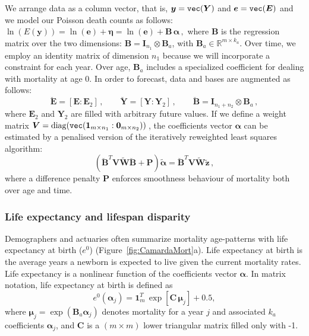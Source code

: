 \documentclass[a4paper,twoside, openright, 12pt, leqno]{article}
\begin{document}
We arrange data as a column vector, that is, $\bm{y} = \verb"vec"(\bm{Y})$ and $\bm{e} = \verb"vec"(\bm{E})$ and we model our Poisson death counts as follows: $\ln(E(\bm{y})) = \ln(\bm{e})+ \bm{\eta} = \ln(\bm{e})+ \bm{B}\,\bm{\alpha}\, , $ where $\bm{B}$ is the regression matrix over the two dimensions: $\bm{B} = \bm{I}_{n_{1}} \otimes \bm{B}_{a}$, with $\bm{B}_{a} \in \mathbb{R}^{m \times k_{a}}$. Over time, we employ an identity matrix of dimension $n_{1}$ because we will incorporate a constraint for each year. Over age, $\bm{B}_{a}$ includes a specialized coefficient for dealing with mortality at age 0. In order to forecast, data and bases are augmented as follows:
%
\begin{equation}\label{eq:AugData}
\breve{\bm{E}} = [\bm{E} : \bm{E}_{2}]\, , \qquad 
\breve{\bm{Y}} = [\bm{Y} : \bm{Y}_{2}]\, , \qquad
\breve{\bm{B}} = \bm{I}_{n_{1}+n_{2}} \otimes \bm{B}_{a}
\, ,
\end{equation}
%
where $\bm{E}_{2}$ and $\bm{Y}_{2}$ are filled with arbitrary future values. If we define a weight matrix $\bm{V} = \mathrm{diag}(\verb"vec"(\bm{1}_{m\times n_{1}}:\bm{0}_{m\times n_{2}}))\,$, the coefficients vector $\bm{\alpha}$
can be estimated by a penalised version of the iteratively reweighted least squares algorithm: 
%
\begin{equation}\label{eq:penIRWLSfor}
(\breve{\bm{B}}^{T} \bm{V} \tilde{\bm{W}} \breve{\bm{B}} + \bm{P}) \tilde{\bm{\alpha}} =
\breve{\bm{B}}^{T}\bm{V} \tilde{\bm{W}}\tilde{\bm{z}} \, ,
\end{equation} 	
%
where a difference penalty $\bm{P}$ enforces smoothness behaviour of mortality both over age and time. 

\subsubsection{Life expectancy and lifespan disparity}

Demographers and actuaries often summarize mortality age-patterns with life expectancy at  birth ($e^0$) (Figure~\ref{fig:CamardaMort}a). Life expectancy at birth is the average years a newborn is expected to live given the current mortality rates. Life expectancy is a nonlinear function of the coefficients vector $\bm{\alpha}$. In matrix notation, life expectancy at birth is defined as
%
\begin{equation}\label{eq:e0}
e^{0} (\bm{\alpha}_{j}) =  \bm{1}_{m}^{T} \, \exp[ \bm{C} \, \bm{\mu}_{j}]  + 0.5, 
\end{equation}
%
where $\bm{\mu}_{j} = \exp(\bm{B}_{a}\bm{\alpha}_{j})$ denotes mortality for a year $j$ and associated $k_{a}$ coefficients $\bm{\alpha}_{j}$, and $\bm{C}$ is a $(m \times m)$ lower triangular matrix filled only with -1.
\end{document}
